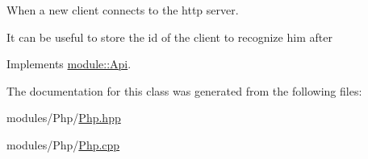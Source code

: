 When a new client connects to the http server. 

It can be useful to store the id of the client to recognize him after 

Implements \hyperlink{structmodule_1_1Api_aa83ddc92765200dd65f915498175c2be}{module\+::\+Api}.



The documentation for this class was generated from the following files\+:\begin{DoxyCompactItemize}
\item 
modules/\+Php/\hyperlink{Php_8hpp}{Php.\+hpp}\item 
modules/\+Php/\hyperlink{Php_8cpp}{Php.\+cpp}\end{DoxyCompactItemize}
